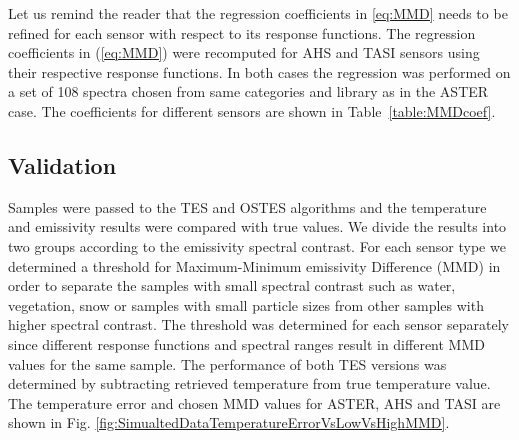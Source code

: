 Let us remind the reader that the regression coefficients in \ref{eq:MMD} needs to be refined for each sensor with respect to its response functions. The regression coefficients in (\ref{eq:MMD}) were recomputed for AHS and TASI sensors using their respective response functions. In both cases the regression was performed on a set of 108 spectra chosen from same categories and library as in the ASTER case. The coefficients for different sensors are shown in Table~\ref{table:MMDcoef}.

\subsection*{Validation}

Samples were passed to the TES and OSTES algorithms and the temperature and emissivity results were compared with true values. We divide the results into two groups according to the emissivity spectral contrast. For each sensor type we determined a threshold for Maximum-Minimum emissivity Difference (MMD) in order to separate the samples with small spectral contrast such as water, vegetation, snow or samples with small particle sizes from other samples with higher spectral contrast. The threshold was determined for each sensor separately since different response functions and spectral ranges result in different MMD values for the same sample. The performance of both TES versions was determined by subtracting retrieved temperature from true temperature value. The temperature error and chosen MMD values for ASTER, AHS and TASI are shown in Fig. \ref{fig:SimualtedDataTemperatureErrorVsLowVsHighMMD}.

